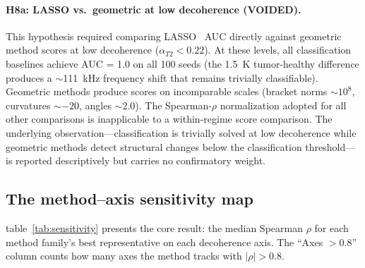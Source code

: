 \documentclass[11pt]{article}
\begin{document}
\paragraph{H8a: LASSO vs.\ geometric at low decoherence (VOIDED).}
\label{sec:deviation-h8a}
This hypothesis required comparing LASSO~\citep{tibshirani1996regression}
AUC directly against geometric method scores at low decoherence ($\alpha_{T2} < 0.22$).  At these
levels, all classification baselines achieve AUC = 1.0 on all 100 seeds
(the 1.5~K tumor-healthy difference produces a $\sim$111~kHz frequency
shift that remains trivially classifiable).  Geometric methods produce
scores on incomparable scales (bracket norms $\sim 10^8$, curvatures
$\sim -20$, angles $\sim 2.0$).  The Spearman-$\rho$ normalization
adopted for all other comparisons is inapplicable to a within-regime
score comparison.  The underlying observation---classification is
trivially solved at low decoherence while geometric methods detect
structural changes below the classification threshold---is reported
descriptively but carries no confirmatory weight.

\subsection{The method--axis sensitivity map}

table~\ref{tab:sensitivity} presents the core result: the median
Spearman $\rho$ for each method family's best representative on each
decoherence axis.  The ``Axes $> 0.8$'' column counts how many axes
the method tracks with $|\rho| > 0.8$.
\end{document}
